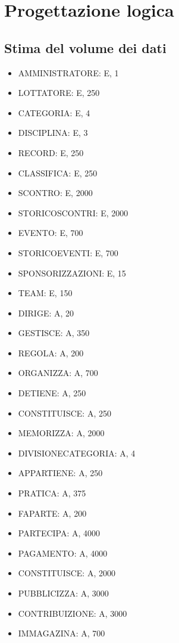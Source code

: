 \documentclass[a4paper,12pt]{report}
\begin{document}
\chapter{Progettazione logica}
\section{Stima del volume dei dati}
\begin{itemize}
    \item AMMINISTRATORE: E, 1
    \item LOTTATORE: E, 250
    \item CATEGORIA: E, 4
    \item DISCIPLINA: E, 3
    \item RECORD: E, 250
    \item CLASSIFICA: E, 250
    \item SCONTRO: E, 2000
    \item STORICO\textunderscore SCONTRI: E, 2000
    \item EVENTO: E, 700
    \item STORICO\textunderscore EVENTI: E, 700
    \item SPONSORIZZAZIONI: E, 15
    \item TEAM: E, 150
    \item DIRIGE: A, 20
    \item GESTISCE: A, 350
    \item REGOLA: A, 200
    \item ORGANIZZA: A, 700
    \item DETIENE: A, 250
    \item CONSTITUISCE: A, 250
    \item MEMORIZZA: A, 2000
    \item DIVISIONE\textunderscore CATEGORIA: A, 4
    \item APPARTIENE: A, 250
    \item PRATICA: A, 375
    \item FA\textunderscore PARTE: A, 200
    \item PARTECIPA: A, 4000
    \item PAGAMENTO: A, 4000
    \item CONSTITUISCE: A, 2000
    \item PUBBLICIZZA: A, 3000
    \item CONTRIBUIZIONE: A, 3000
    \item IMMAGAZINA: A, 700
\end{itemize}
\end{document}

